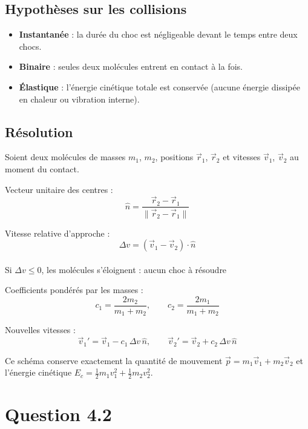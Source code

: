 \documentclass[a4paper]{article}
\begin{document}
    \subsection*{Hypothèses sur les collisions}
    \begin{itemize}
        \item \textbf{Instantanée} : la durée du choc est négligeable devant le temps entre deux chocs.
        \item \textbf{Binaire} : seules deux molécules entrent en contact à la fois.
        \item \textbf{Élastique} : l'énergie cinétique totale est conservée (aucune énergie dissipée en chaleur ou vibration interne).
    \end{itemize}

    \subsection*{Résolution}
    Soient deux molécules de masses $m_1$, $m_2$, positions $\vec{r}_1$, $\vec{r}_2$ et vitesses $\vec{v}_1$, $\vec{v}_2$ au moment du contact.

    Vecteur unitaire des centres :
    $$\hat{n} = \dfrac{\vec{r}_2 - \vec{r}_1}{\|\vec{r}_2 - \vec{r}_1\|}$$

    Vitesse relative d'approche :
    $$\Delta v = (\vec{v}_1 - \vec{v}_2) \cdot \hat{n}$$\\
    Si $\Delta v \leq 0$, les molécules s'éloignent : aucun choc à résoudre

    Coefficients pondérés par les masses :
    $$c_1 = \frac{2m_2}{m_1+m_2}, \qquad c_2 = \frac{2m_1}{m_1+m_2}$$

    Nouvelles vitesses :
    $$\vec{v}_1' = \vec{v}_1 - c_1\,\Delta v\,\hat{n}, \qquad \vec{v}_2' = \vec{v}_2 + c_2\,\Delta v\,\hat{n}$$

    Ce schéma conserve exactement la quantité de mouvement $\vec{p} = m_1\vec{v}_1 + m_2\vec{v}_2$ et l'énergie cinétique $E_c = \tfrac{1}{2}m_1v_1^2 + \tfrac{1}{2}m_2v_2^2$.

\section*{Question 4.2}
\end{document}
